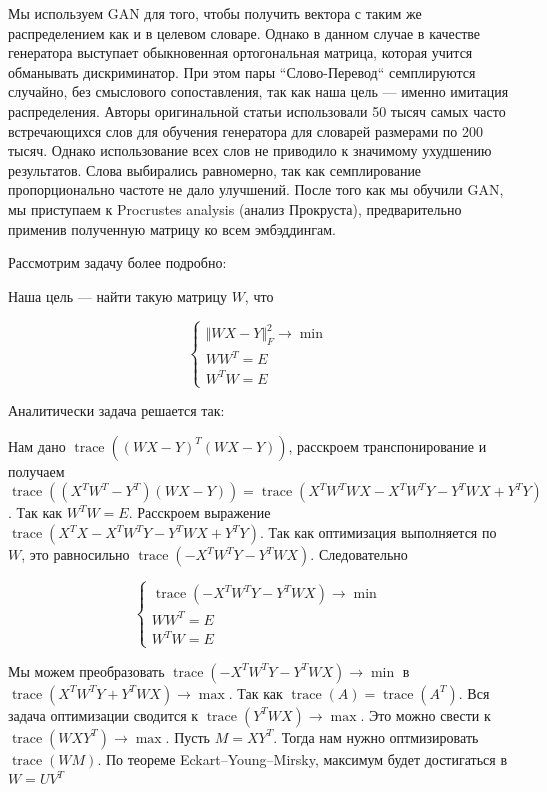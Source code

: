 \documentclass{article}
\begin{document}
    \quad

    Мы используем GAN для того, чтобы получить вектора с таким же распределением как и в целевом словаре.
    Однако в данном случае в качестве генератора выступает обыкновенная ортогональная матрица, 
    которая учится обманывать дискриминатор.
    При этом пары ``Слово-Перевод`` семплируются случайно, без смыслового сопоставления, так  
    как наша цель --- именно имитация распределения. Авторы оригинальной статьи использовали 50 тысяч
    самых часто встречающихся слов для обучения генератора для словарей размерами по 200 тысяч.
    Однако использование всех слов не приводило к значимому ухудшению результатов. 
    Слова выбирались равномерно, так как семплирование пропорционально частоте не дало улучшений.
    После того как мы обучили GAN, мы приступаем к Procrustes analysis (анализ Прокруста), предварительно 
    применив полученную матрицу ко всем эмбэддингам.

    \quad

    Рассмотрим задачу более подробно: 
    
    Наша цель --- найти такую матрицу $W$, что 

    \[
    \begin{cases}
        \Vert WX - Y \Vert_{F}^{2} \rightarrow \min \\
        W W^{T} = E \\
        W^{T} W = E
    \end{cases}
    \]

    Аналитически задача решается так: 

    Нам дано $\operatorname{trace}( ( WX - Y)^{T} (WX - Y))$, расскроем транспонирование и получаем 
    $\operatorname{trace}( ( X^{T} W^{T} - Y^{T}) (WX - Y)) = \operatorname{trace}( X^{T} W^{T} WX - X^{T} W^{T} Y   - Y^{T} WX + Y^{T} Y)$. 
    Так как $W^{T} W = E$. Расскроем выражение $\operatorname{trace}( X^{T}X - X^{T} W^{T} Y   - Y^{T} WX + Y^{T} Y)$. Так как 
    оптимизация выполняется по $W$, это равносильно $\operatorname{trace}(-X^{T} W^{T} Y   - Y^{T} WX)$. Следовательно

    \[
    \begin{cases}
        \operatorname{trace}(-X^{T} W^{T} Y   - Y^{T} WX) \rightarrow \min \\
        W W^{T} = E \\
        W^{T} W = E
    \end{cases}
    \]

    Мы можем преобразовать $\operatorname{trace}(-X^{T} W^{T} Y   - Y^{T} WX) \rightarrow \min$ в 
    $\operatorname{trace}(X^{T} W^{T} Y  + Y^{T} WX) \rightarrow \max$. Так как $\operatorname{trace}(A) = \operatorname{trace}(A^{T})$.
    Вся задача оптимизации сводится к $\operatorname{trace}(Y^{T} WX) \rightarrow \max$. Это можно свести к $\operatorname{trace}(WXY^{T}) \rightarrow \max$.
    Пусть $M = XY^{T}$. Тогда нам нужно оптмизировать $\operatorname{trace}(WM)$. По теореме Eckart–Young–Mirsky, максимум будет достигаться 
    в $W=UV^{T}$
\end{document}
